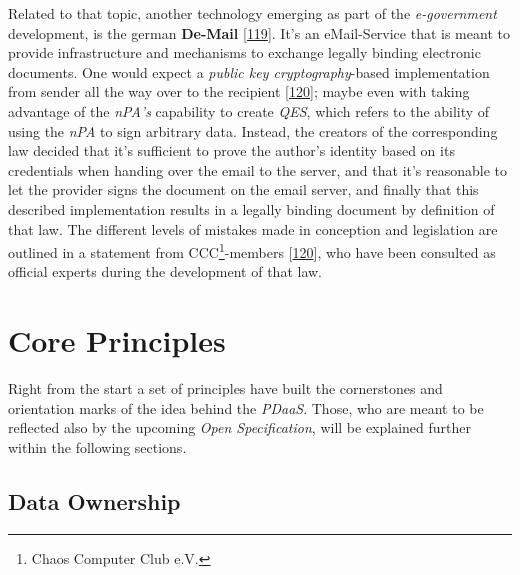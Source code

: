 \documentclass[12pt,english,a4paper,titlepage,cleardoublepage=empty,dottedtoc]{report}
\begin{document}
Related to that topic, another technology emerging as part of the
\emph{e-government} development, is the german
\textbf{\protect\hypertarget{def--de-mail}{}{De-Mail}}
{[}\protect\hyperlink{ref-web_2017_about-de-mail}{119}{]}. It's an
eMail-Service that is meant to provide infrastructure and mechanisms to
exchange legally binding electronic documents. One would expect a
\emph{public key cryptography}-based implementation from sender all the
way over to the recipient
{[}\protect\hyperlink{ref-statement_2013_de-mail}{120}{]}; maybe even
with taking advantage of the \emph{nPA's} capability to create
\emph{QES}, which refers to the ability of using the \emph{nPA} to sign
arbitrary data. Instead, the creators of the corresponding law decided
that it's sufficient to prove the author's identity based on its
credentials when handing over the email to the server, and that it's
reasonable to let the provider signs the document on the email server,
and finally that this described implementation results in a legally
binding document by definition of that law. The different levels of
mistakes made in conception and legislation are outlined in a statement
from CCC\footnote{Chaos Computer Club e.V.}-members
{[}\protect\hyperlink{ref-statement_2013_de-mail}{120}{]}, who have been
consulted as official experts during the development of that law.

\hypertarget{core-principles}{\chapter{Core
Principles}\label{core-principles}}

Right from the start a set of principles have built the cornerstones and
orientation marks of the idea behind the \emph{PDaaS}. Those, who are
meant to be reflected also by the upcoming \emph{Open Specification},
will be explained further within the following sections.

\section{Data Ownership}\label{data-ownership}
\end{document}
